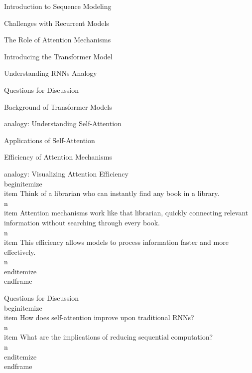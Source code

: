 \documentclass{beamer}
\begin{document}
\begin{frame}[]{Introduction to Sequence Modeling}
\begin{frame}[]{Challenges with Recurrent Models}
\begin{frame}[]{The Role of Attention Mechanisms}
\begin{frame}[]{Introducing the Transformer Model}
\begin{frame}[plain]{Understanding RNNs Analogy}
\begin{frame}[]{Questions for Discussion}
\begin{frame}[]{Background of Transformer Models}
\begin{frame}[plain]{analogy: Understanding Self-Attention}
\begin{frame}[]{Applications of Self-Attention}
\begin{frame}[]{Efficiency of Attention Mechanisms}
\begingroup
{}\n{}\n\begin{frame}[plain]{analogy: Visualizing Attention Efficiency}\n\\begin{itemize}
\\item Think of a librarian who can instantly find any book in a library.\\n\\item Attention mechanisms work like that librarian, quickly connecting relevant information without searching through every book.\\n\\item This efficiency allows models to process information faster and more effectively.\\n\\end{itemize}
\\end{frame}

\endgroup

\begingroup
{}\n{}\n\begin{frame}[]{Questions for Discussion}\n\\begin{itemize}
\\item How does self-attention improve upon traditional RNNs?\\n\\item What are the implications of reducing sequential computation?\\n\\end{itemize}
\\end{frame}

\endgroup


\end{frame}
\end{frame}
\end{frame}
\end{frame}
\end{frame}
\end{frame}
\end{frame}
\end{frame}
\end{frame}
\end{frame}
\end{frame}
\end{frame}
\end{document}
